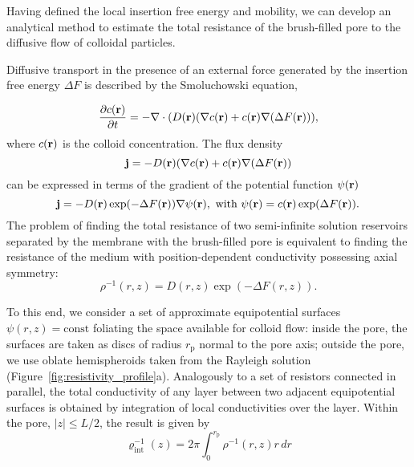 \documentclass[12pt, a4paper]{article}
\begin{document}
Having defined the local insertion free energy and mobility, we can develop an analytical method to estimate the total resistance of the brush-filled pore to the diffusive flow of colloidal particles.

Diffusive transport in the presence of an external force generated by the insertion free energy $\Delta F$ is described by the Smoluchowski equation,

\begin{equation}
    \frac{\partial c(\bold r)}{\partial t}=-{\bold \nabla}\cdot (D(\bold r)({\bold \nabla}c({\bold r})+c({\bold r}){\bold \nabla}(\Delta F({\bold  r}))),
    \label{eq:Smoluch}
\end{equation}
where $c(\bold r)$ is the colloid concentration. The flux density 
\begin{equation}
    \bold j=- D(\bold r)({\bold \nabla}c({\bold r})+c({\bold r}){\bold \nabla}(\Delta F({\bold  r}))
    \label{eq:j}
\end{equation}
can be expressed in terms of the gradient of the potential function $\psi(\bold r)$
\begin{equation}
    \bold j=- D(\bold r) \exp(-\Delta F({\bold  r}))  {\bold \nabla} \psi(\bold r), \text{ with } \psi(\bold r)=c(\bold r)\exp(\Delta F(\bold r)).
    \label{eq:psi}
\end{equation}
The problem of finding the total resistance of two semi-infinite solution reservoirs separated by the membrane with the brush-filled pore is equivalent to finding the resistance of the medium with position-dependent conductivity possessing axial symmetry:
\begin{equation}
    \rho^{-1} (r,z)= D(r,z)\exp(-\Delta F(r,z)).
    \label{eq:rho}
\end{equation}


To this end, we consider a set of approximate equipotential surfaces $\psi(r,z)=\text{const}$ foliating the space available for colloid flow: inside the pore, the surfaces are taken as  discs of radius $r_{\text{p}}$ normal to the pore axis; outside the pore, we use oblate hemispheroids taken from the Rayleigh solution \cite{Strutt1878} (Figure~\ref{fig:resistivity_profile}a).
Analogously to a set of resistors connected in parallel, the total conductivity of any layer between two adjacent equipotential surfaces is obtained by integration of local conductivities over the layer. Within the pore, $|z|\leq L/2$, the result is given by
\begin{equation}
\varrho_{\text{int}}^{-1}(z)= 2\pi\int_{0}^{r_{\text{p}}^{}} \rho^{-1}(r,z) r \, dr
\label{eq:varrho1}
\end{equation}
\end{document}
